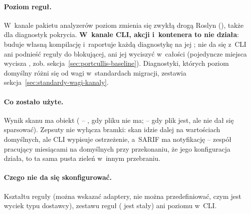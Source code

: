 \paragraph{Poziom reguł.} W~kanale pakietu analyzerów poziom zmienia się zwykłą drogą
Roslyn (), także dla diagnostyk pokrycia.
\textbf{W~kanale CLI, akcji i~kontenera to nie działa}:  buduje
własną kompilację i~raportuje każdą diagnostykę na jej ; nie da
się z~CLI ani podnieść reguły do blokującej, ani jej wyciszyć w~całości (pojedyncze miejsca
wycisza , zob. sekcja~\ref{sec:portcullis-baseline}). Diagnostyki, których poziom
domyślny różni się od wagi w~standardach migracji, zestawia
sekcja~\ref{sec:standardy-wagi-kanaly}.

\paragraph{Co zostało użyte.} Wynik skanu ma obiekt 
( -- , gdy pliku nie ma;  -- gdy plik jest, ale
nie dał się sparsować). Zepsuty  nie wyłącza bramki: skan idzie
dalej na wartościach domyślnych, ale CLI wypisuje ostrzeżenie, a~SARIF ma notyfikację --
zespół pracujący miesiącami na domyślnych przy przekonaniu, że jego konfiguracja działa,
to ta sama pusta zieleń w~innym przebraniu.

\paragraph{Czego nie da się skonfigurować.} Kształtu reguły (można wskazać adaptery, nie
można przedefiniować, czym jest wyciek typu dostawcy), zestawu reguł
( jest stały) ani poziomu w~CLI.


